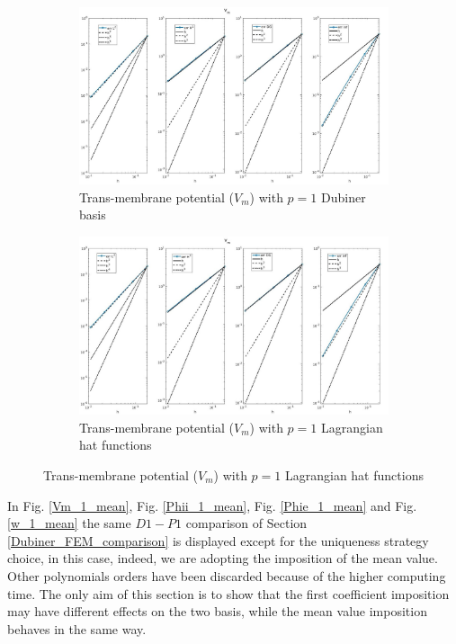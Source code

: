 \documentclass[a4paper,11pt]{article}
\begin{document}
\begin{figure}[H] 
	\caption{Comparison of the trans-membrane potential ($V_m$)}
	\label{Vm_1_mean}
	\begin{subfigure}{\textwidth}
		\begin{center}
			\includegraphics[width = \textwidth]{./errors/D1_Vm_2.jpg}
			\caption{Trans-membrane potential ($V_m$) with $p=1$ Dubiner basis}
		\end{center}
	\end{subfigure}
	\begin{subfigure}{\textwidth}
		\begin{center}
			\includegraphics[width =\textwidth]{./errors/P1_Vm_2.jpg}
			\caption{Trans-membrane potential ($V_m$) with $p=1$ Lagrangian hat functions}
		\end{center}
	\end{subfigure}
\end{figure}


\noindent In Fig. \ref{Vm_1_mean}, Fig. \ref{Phii_1_mean}, Fig. \ref{Phie_1_mean} and Fig. \ref{w_1_mean} the same $D1-P1$ comparison of Section \ref{Dubiner_FEM_comparison} is displayed except for the uniqueness strategy choice, in this case, indeed, we are adopting the imposition of the mean value. Other polynomials orders have been discarded because of the higher computing time. The only aim of this section is to show that the first coefficient imposition may have different effects on the two basis, while the mean value imposition behaves in the same way.
\end{document}
